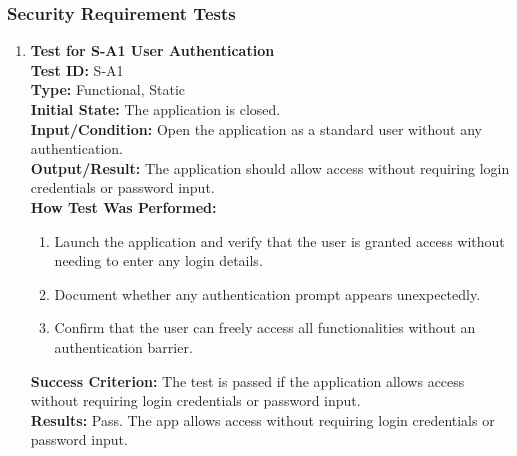\documentclass[12pt, titlepage]{article}
\begin{document}
\subsubsection{Security Requirement Tests}
\begin{enumerate}
    \item \textbf{Test for S-A1 User Authentication} \\
      \newline
      \textbf{Test ID:} S-A1 \\
      \textbf{Type:} Functional, Static \\
      \textbf{Initial State:} The application is closed. \\
      \textbf{Input/Condition:} Open the application as a standard user without any authentication. \\
      \textbf{Output/Result:} The application should allow access without requiring login credentials or password input. \\
      \textbf{How Test Was Performed:}
      \begin{enumerate}
          \item Launch the application and verify that the user is granted access without needing to enter any login details.
          \item Document whether any authentication prompt appears unexpectedly.
          \item Confirm that the user can freely access all functionalities without an authentication barrier.
      \end{enumerate}
      \textbf{Success Criterion:} The test is passed if the application allows access without requiring login credentials or password input.\\
      \textbf{Results:} Pass. The app allows access without requiring login credentials or password input.\\


\end{enumerate}
\end{document}
